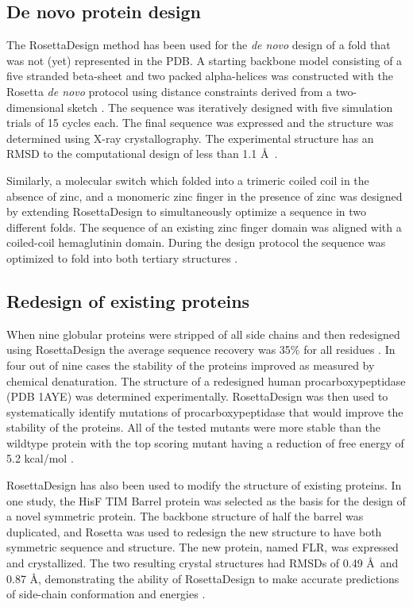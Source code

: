 \subsection{De novo protein design}

The RosettaDesign method has been used for the \textit{de novo} design of a fold that was not (yet) represented in the \ac{PDB}.
A starting backbone model consisting of a five stranded beta-sheet and two packed alpha-helices was constructed with the Rosetta \textit{de novo} protocol using distance constraints derived from a two-dimensional sketch  \citep{Rohl:2004dh}.
The sequence was iteratively designed with five simulation trials of 15 cycles each.
The final sequence was expressed and the structure was determined using X-ray crystallography.
The experimental structure has an \ac{RMSD} to the computational design of less than 1.1 \AA\  \citep{Kuhlman:2003kp}. 

Similarly, a molecular switch which folded into a trimeric coiled coil in the absence of zinc, and a monomeric zinc finger in the presence of zinc was designed by extending RosettaDesign to simultaneously optimize a sequence in two different folds.
The sequence of an existing zinc finger domain was aligned with a coiled-coil hemaglutinin domain.
During the design protocol the sequence was optimized to fold into both tertiary structures  \citep{Ambroggio:2006he}.

\subsection{Redesign of existing proteins}
When nine globular proteins were stripped of all side chains and then redesigned using RosettaDesign the average sequence recovery was 35\% for all residues  \citep{Kuhlman:2003kp}.
In four out of nine cases the stability of the proteins improved as measured by chemical denaturation.
The structure of a redesigned human procarboxypeptidase (\ac{PDB} 1AYE)  \citep{GarciaSaez:1997cn} was determined experimentally.
RosettaDesign was then used to systematically identify mutations of procarboxypeptidase that would improve the stability of the proteins.
All of the tested mutants were more stable than the wildtype protein with the top scoring mutant having a reduction of free energy of 5.2 kcal/mol  \citep{Dantas:2007iq}.

RosettaDesign has also been used to modify the structure of existing proteins.
In one study, the HisF TIM Barrel protein was selected as the basis for the design of a novel symmetric protein.
The backbone structure of half the barrel was duplicated, and Rosetta was used to redesign the new structure to have both symmetric sequence and structure.
The new protein, named FLR, was expressed and crystallized.
The two resulting crystal structures had RMSDs of 0.49 \AA\ and 0.87 \AA, demonstrating the ability of RosettaDesign to make accurate predictions of side-chain conformation and energies  \citep{Fortenberry:2011hw}.


